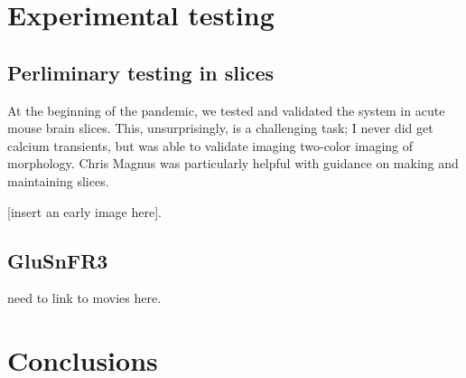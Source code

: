 \documentclass[a4paper,10pt]{article}
\begin{document}
\section{Experimental testing}

\subsection{Perliminary testing in slices}

At the beginning of the pandemic, we tested and validated the system in acute mouse brain slices.  This, unsurprisingly, is a challenging task; I never did get  calcium transients, but was able to validate imaging two-color imaging of morphology. Chris Magnus was particularly helpful with guidance on making and maintaining slices. 

[insert an early image here].  

\subsection{GluSnFR3}

need to link to movies here. 

\section{Conclusions}
\end{document}
